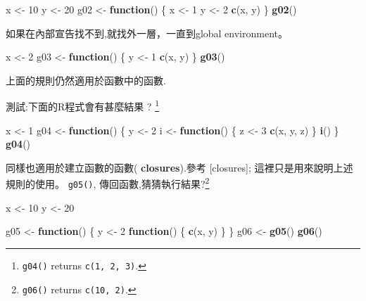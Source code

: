 \documentclass[]{book}
\newenvironment{Shaded}{\begin{snugshade}}{\end{snugshade}}
\newcommand{\KeywordTok}[1]{\textcolor[rgb]{0.13,0.29,0.53}{\textbf{#1}}}
\newcommand{\DecValTok}[1]{\textcolor[rgb]{0.00,0.00,0.81}{#1}}
\newcommand{\StringTok}[1]{\textcolor[rgb]{0.31,0.60,0.02}{#1}}
\newcommand{\ControlFlowTok}[1]{\textcolor[rgb]{0.13,0.29,0.53}{\textbf{#1}}}
\newcommand{\NormalTok}[1]{#1}
\let\rmarkdownfootnote\footnote%
\def\footnote{\protect\rmarkdownfootnote}
\theoremstyle{definition}
\theoremstyle{definition}
\theoremstyle{definition}
\theoremstyle{remark}
\begin{document}
\begin{Shaded}
\begin{Highlighting}[]
\NormalTok{x <-}\StringTok{ }\DecValTok{10}
\NormalTok{y <-}\StringTok{ }\DecValTok{20}
\NormalTok{g02 <-}\StringTok{ }\ControlFlowTok{function}\NormalTok{() \{}
\NormalTok{  x <-}\StringTok{ }\DecValTok{1}
\NormalTok{  y <-}\StringTok{ }\DecValTok{2}
  \KeywordTok{c}\NormalTok{(x, y)}
\NormalTok{\}}
\KeywordTok{g02}\NormalTok{()}
\end{Highlighting}
\end{Shaded}

如果在內部宣告找不到,就找外一層，一直到global environment。

\begin{Shaded}
\begin{Highlighting}[]
\NormalTok{x <-}\StringTok{ }\DecValTok{2}
\NormalTok{g03 <-}\StringTok{ }\ControlFlowTok{function}\NormalTok{() \{}
\NormalTok{  y <-}\StringTok{ }\DecValTok{1}
  \KeywordTok{c}\NormalTok{(x, y)}
\NormalTok{\}}
\KeywordTok{g03}\NormalTok{()}
\end{Highlighting}
\end{Shaded}

上面的規則仍然適用於函數中的函數.

測試:下面的R程式會有甚麼結果 ? \footnote{\texttt{g04()} returns
  \texttt{c(1,\ 2,\ 3)}.}

\begin{Shaded}
\begin{Highlighting}[]
\NormalTok{x <-}\StringTok{ }\DecValTok{1}
\NormalTok{g04 <-}\StringTok{ }\ControlFlowTok{function}\NormalTok{() \{}
\NormalTok{  y <-}\StringTok{ }\DecValTok{2}
\NormalTok{  i <-}\StringTok{ }\ControlFlowTok{function}\NormalTok{() \{}
\NormalTok{    z <-}\StringTok{ }\DecValTok{3}
    \KeywordTok{c}\NormalTok{(x, y, z)}
\NormalTok{  \}}
  \KeywordTok{i}\NormalTok{()}
\NormalTok{\}}
\KeywordTok{g04}\NormalTok{()}
\end{Highlighting}
\end{Shaded}

同樣也適用於建立函數的函數( \textbf{closures}).參考 {[}closures{]};
這裡只是用來說明上述規則的使用。 \texttt{g05()},
傳回函數,猜猜執行結果?\footnote{\texttt{g06()} returns
  \texttt{c(10,\ 2)}.}

\begin{Shaded}
\begin{Highlighting}[]
\NormalTok{x <-}\StringTok{ }\DecValTok{10}
\NormalTok{y <-}\StringTok{ }\DecValTok{20}

\NormalTok{g05 <-}\StringTok{ }\ControlFlowTok{function}\NormalTok{() \{}
\NormalTok{  y <-}\StringTok{ }\DecValTok{2}
  \ControlFlowTok{function}\NormalTok{() \{}
    \KeywordTok{c}\NormalTok{(x, y)}
\NormalTok{  \}}
\NormalTok{\}}
\NormalTok{g06 <-}\StringTok{ }\KeywordTok{g05}\NormalTok{()}
\KeywordTok{g06}\NormalTok{()}
\end{Highlighting}
\end{Shaded}
\end{document}
